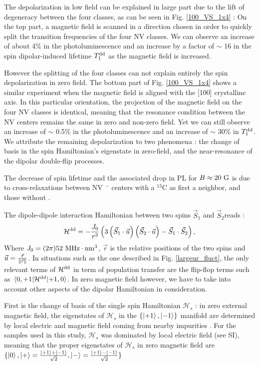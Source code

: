 \documentclass[preprintnumbers,amsmath,amssymb,superscriptaddress,twocolumn,showpacs]{revtex4-2}
\begin{document}
The depolarization in low field can be explained in large part due to the lift of degeneracy between the four classes, as can be seen in Fig. \ref{100_VS_1x4} : On the top part, a magnetic field is scanned in a direction chosen in order to quickly split the transition frequencies of the four NV classes. We can observe an increase of about 4\% in the photoluminescence and an increase by a factor of $\sim$ 16 in the spin dipolar-induced lifetime ${T_1^{\rm dd}}$ as the magnetic field is increased.

However the splitting of the four classes can not explain entirely the spin depolarization in zero field. The bottom part of Fig. \ref{100_VS_1x4} shows a similar experiment when the magnetic field is aligned with the [100] crystalline axis. In this particular orientation, the projection of the magnetic field on the four NV classes is identical, meaning that the resonance condition between the NV centers remains the same in zero and non-zero field. Yet we can still observe an increase of $\sim$ 0.5\% in the photoluminescence and an increase of $\sim$ 30\% in ${T_1^{\rm dd}}$.
We attribute the remaining depolarization to two phenomena : the change of basis in the spin Hamiltonian's eigenstate in zero-field, and the near-resonance of the dipolar double-flip processes.

The decrease of spin lifetime and the associated drop in PL for $B\approx 20\ \rm G$ is due to cross-relaxations between NV $^-$ centers with a $^{13}$C as first a neighbor, and those without \cite{pellet2021optical}.

The dipole-dipole interaction Hamiltonian between two spins ${\vec S}_1$ and ${\vec S}_2$reads :
\begin{equation}
\mathcal{H}^{\rm dd}= -\frac{J_0}{r^3}\left(3\left({\vec S}_1 \cdot \vec u \right)\left({\vec S}_2 \cdot \vec u \right) - {\vec S}_1 \cdot {\vec S}_2  \right),
\end{equation}
Where $J_0= (2 \pi) 52\ \rm MHz \cdot \rm{nm}^3$, $\vec r$ is the relative positions of the two spins and $\vec u = \frac{\vec r}{\norm{\vec r}}$. In situations such as the one described in Fig. \ref{largeur_fluct}, the only relevant terms of $\mathcal{H}^{\rm dd}$ in term of population transfer are the flip-flop terms such as $\mel{0,+1}{\mathcal{H}^{\rm dd}}{+1,0}$. In zero magnetic field however, we have to take into account other aspects of the dipolar Hamiltonian in consideration.

First is the change of basis of the single spin Hamiltonian $\mathcal{H}_s$ : in zero external magnetic field, the eigenstates of $\mathcal{H}_s$ in the $\{\ket{+1},\ket{-1}\}$ manifold are determined by local electric and magnetic field coming from nearby impurities \cite{mittiga2018imaging}. For the samples used in this study, $\mathcal{H}_s$ was dominated by local electric field (see SI), meaning that the proper eigenstates of $\mathcal{H}_s$ in zero magnetic field are $\{ \ket{0},\ket{+}=\frac{\ket{+1}+\ket{-1}}{\sqrt{2}},\ket{-}=\frac{\ket{+1}-\ket{-1}}{\sqrt{2}} \} $
\end{document}
